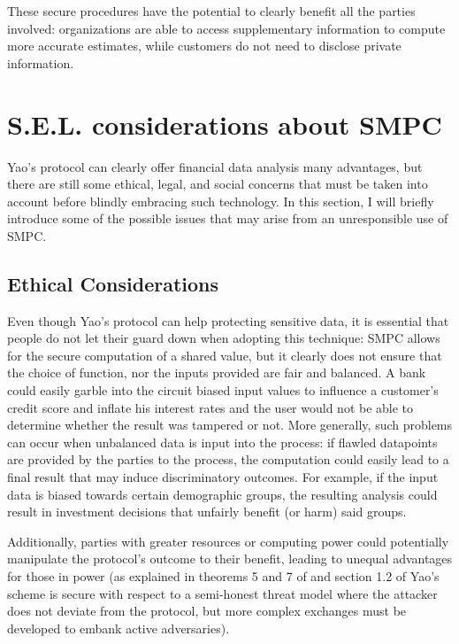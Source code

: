 \documentclass[12pt]{article}
\begin{document}
These secure procedures have the potential to clearly benefit all the parties involved: organizations are able to access supplementary information to compute more accurate estimates, while customers do not need to disclose private information.

\section{S.E.L. considerations about SMPC}\label{sec:sel}

Yao's protocol can clearly offer financial data analysis many advantages, but there are still some ethical, legal, and social concerns that must be taken into account before blindly embracing such technology. In this section, I will briefly introduce some of the possible issues that may arise from an unresponsible use of SMPC.

\subsection{Ethical Considerations}

Even though Yao's protocol can help protecting sensitive data, it is essential that people do not let their guard down when adopting this technique: SMPC allows for the secure computation of a shared value, but it clearly does not ensure that the choice of function, nor the inputs provided are fair and balanced. A bank could easily garble into the circuit biased input values to influence a customer's credit score and inflate his interest rates and the user would not be able to determine whether the result was tampered or not. More generally, such problems can occur when unbalanced data is input into the process: if flawled datapoints are provided by the parties to the process, the computation could easily lead to a final result that may induce discriminatory outcomes. For example, if the input data is biased towards certain demographic groups, the resulting analysis could result in investment decisions that unfairly benefit (or harm) said groups.

Additionally, parties with greater resources or computing power could potentially manipulate the protocol's outcome to their benefit, leading to unequal advantages for those in power (as explained in theorems 5 and 7 of \cite{attacks1} and section 1.2 of \cite{attacks2} Yao's scheme is secure with respect to a semi-honest threat model where the attacker does not deviate from the protocol, but more complex exchanges must be developed to embank active adversaries).
\end{document}
